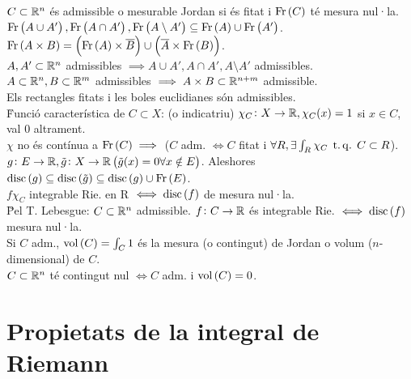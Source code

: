 \ci $C\subset\mathbb{R}^n$ és admissible o mesurable Jordan si és fitat i $\operatorname{Fr}\left( C \right)$ té mesura nul·la.\\
\ci $\operatorname{Fr}\left( A \cup A' \right), \operatorname{Fr}\left( A\cap A' \right), \operatorname{Fr}\left( A\setminus A' \right) \subseteq \operatorname{Fr}\left( A \right) \cup \operatorname{Fr}\left( A' \right)$. \\
\ci $\operatorname{Fr}\left( A\times B \right) = \left( \operatorname{Fr}\left( A \right)\times \overline{B} \right) \cup \left( \overline{A} \times \operatorname{Fr}\left( B \right) \right)$.\\
\ci $A,A'\subset\mathbb{R}^n$ admissibles $\implies A\cup A', A\cap A', A\setminus A'$ admissibles. \\
\ci $A\subset\mathbb{R}^n, B\subset\mathbb{R}^m$ admissibles $\implies A\times B \subset \mathbb{R}^{n+m}$ admissible. \\
\ci Els rectangles fitats i les boles euclidianes són admissibles. \\
\u{Funció característica de $C\subset X$}: (o indicatriu) $\chi_C\colon X \to \mathbb{R}, \chi_C(x) = 1$ si $x \in C$, val $0$ altrament.\\
\ci $\chi$ no és contínua a $\operatorname{Fr}\left( C \right) \implies$ ($C$ adm. $\iff C$ fitat i $\forall R, \exists \int_R \chi_C \operatorname{\;t.q.\;} C\subset R$). \\
\ci $g\colon E\to\mathbb{R}, \tilde{g}\colon X\to\mathbb{R} \left( \tilde{g}(x) = 0 \forall x \notin E \right)$. Aleshores $\operatorname{disc}\left( g \right) \subseteq \operatorname{disc}\left( \tilde{g} \right)\subseteq \operatorname{disc}\left( g \right)\cup \operatorname{Fr}\left( E \right)$. \\
\ci $f\chi_C$ integrable Rie. en R $\iff \operatorname{disc}\left( f \right)$ de mesura nul·la. \\
\u{Pel T. Lebesgue}: $C\subset \mathbb{R}^n$ admissible. $f\colon C \to \mathbb{R}$ és integrable Rie. $\iff \operatorname{disc}\left( f \right)$ mesura nul·la. \\
\ci Si $C$ adm., $\operatorname{vol}\left( C \right) = \int_C 1$ és la mesura (o contingut) de Jordan o volum ($n$-dimensional) de $C$. \\
\ci $C\subset\mathbb{R}^n$ té contingut nul $\iff C$ adm. i $\operatorname{vol}\left( C \right) = 0$.

\section{Propietats de la integral de Riemann}

